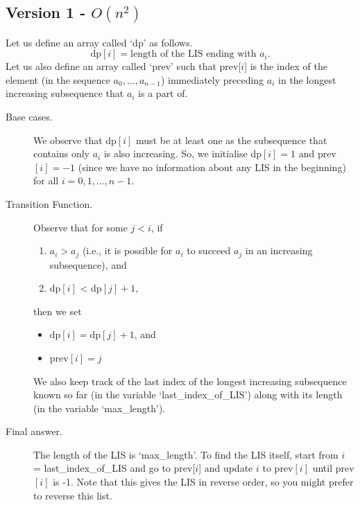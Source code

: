\documentclass[12pt, a4paper]{article}
\theoremstyle{definition}
\theoremstyle{remark}
\begin{document}
\subsection{Version 1 - $O(n^2)$}
Let us define an array called `dp' as follows.
\begin{equation}
    \text{dp}[i] = \text{length of the LIS ending with } a_i.
\end{equation}
Let us also define an array called `prev' such that prev[$i$] is the index of the element (in the sequence $a_0,\ldots,a_{n-1}$) immediately preceding $a_i$ in the longest increasing subsequence that $a_i$ is a part of.
\begin{description}
    \item[Base cases.] We observe that dp$[i]$ must be at least one as the subsequence that contains only $a_i$ is also increasing. So, we initialise dp$[i] = 1$ and prev$[i] = -1$ (since we have no information about any LIS in the beginning) for all $i = 0, 1,\ldots, n-1$.
    \item[Transition Function.] Observe that for some $j < i$, if
        \begin{enumerate}
            \item $a_i > a_j$ (i.e., it is possible for $a_i$ to succeed $a_j$ in an increasing subsequence), and
            \item dp$[i]$ < dp$[j] + 1$,
        \end{enumerate}
        then we set
        \begin{itemize}
            \item $\text{dp}[i] = \text{dp}[j] + 1$, and
            \item $\text{prev}[i] = j$
        \end{itemize}
        We also keep track of the last index of the longest increasing subsequence known so far (in the variable `last\_index\_of\_LIS') along with its length (in the variable `max\_length').
    \item[Final answer.] The length of the LIS is `max\_length'. To find the LIS itself, start from $i$ = last\_index\_of\_LIS and go to prev[$i$] and update $i$ to prev$[i]$ until prev$[i]$ is -1. Note that this gives the LIS in reverse order, so you might prefer to reverse this list.
\end{description}
\end{document}
